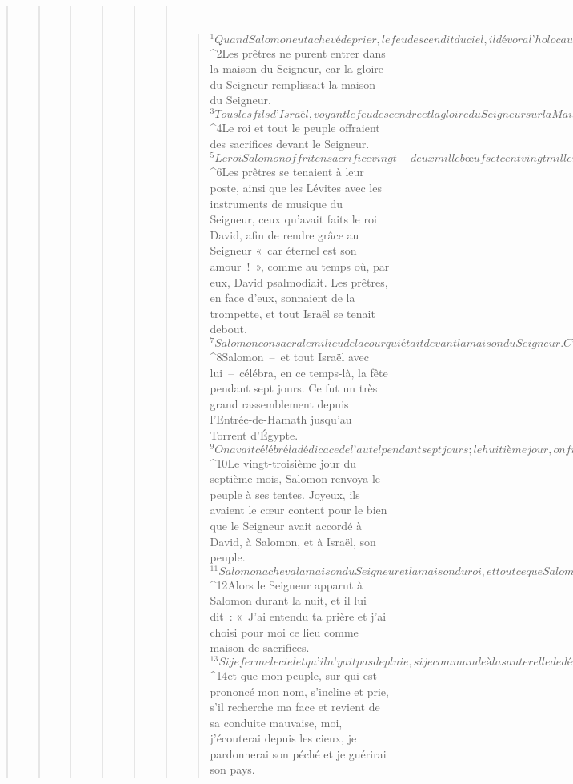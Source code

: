 \begin{verse}
\begin{verse}
\begin{verse}
\begin{verse}
\begin{verse}
\begin{verse}
         
      \bchapter{}
      \begin{verse}
${}^{1}Quand Salomon eut achevé de prier, le feu descendit du ciel, il dévora l’holocauste et les sacrifices ; et la gloire du Seigneur remplit la Maison. 
${}^{2}Les prêtres ne purent entrer dans la maison du Seigneur, car la gloire du Seigneur remplissait la maison du Seigneur. 
${}^{3}Tous les fils d’Israël, voyant le feu descendre et la gloire du Seigneur sur la Maison, s’inclinèrent face contre terre sur le dallage ; ils se prosternèrent pour rendre grâce au Seigneur « car il est bon, éternel est son amour ! »
${}^{4}Le roi et tout le peuple offraient des sacrifices devant le Seigneur. 
${}^{5}Le roi Salomon offrit en sacrifice vingt-deux mille bœufs et cent vingt mille moutons. C’est ainsi que le roi et tout le peuple firent la dédicace de la maison de Dieu. 
${}^{6}Les prêtres se tenaient à leur poste, ainsi que les Lévites avec les instruments de musique du Seigneur, ceux qu’avait faits le roi David, afin de rendre grâce au Seigneur « car éternel est son amour ! », comme au temps où, par eux, David psalmodiait. Les prêtres, en face d’eux, sonnaient de la trompette, et tout Israël se tenait debout.
${}^{7}Salomon consacra le milieu de la cour qui était devant la maison du Seigneur. C’est là, en effet, qu’il offrit les holocaustes et les graisses des sacrifices de paix, car l’autel de bronze que Salomon avait fait ne pouvait pas contenir l’holocauste, l’offrande de céréales et les graisses. 
${}^{8}Salomon – et tout Israël avec lui – célébra, en ce temps-là, la fête pendant sept jours. Ce fut un très grand rassemblement depuis l’Entrée-de-Hamath jusqu’au Torrent d’Égypte. 
${}^{9}On avait célébré la dédicace de l’autel pendant sept jours ; le huitième jour, on fit une réunion solennelle, et la fête dura encore sept jours. 
${}^{10}Le vingt-troisième jour du septième mois, Salomon renvoya le peuple à ses tentes. Joyeux, ils avaient le cœur content pour le bien que le Seigneur avait accordé à David, à Salomon, et à Israël, son peuple.
${}^{11}Salomon acheva la maison du Seigneur et la maison du roi, et tout ce que Salomon avait désiré faire dans la maison du Seigneur et dans sa propre maison, il le mena à bien. 
${}^{12}Alors le Seigneur apparut à Salomon durant la nuit, et il lui dit : « J’ai entendu ta prière et j’ai choisi pour moi ce lieu comme maison de sacrifices. 
${}^{13}Si je ferme le ciel et qu’il n’y ait pas de pluie, si je commande à la sauterelle de dévorer le pays, si j’envoie la peste dans mon peuple, 
${}^{14}et que mon peuple, sur qui est prononcé mon nom, s’incline et prie, s’il recherche ma face et revient de sa conduite mauvaise, moi, j’écouterai depuis les cieux, je pardonnerai son péché et je guérirai son pays. 

\end{verse}
\end{verse}
\end{verse}
\end{verse}
\end{verse}
\end{verse}
\end{verse}
